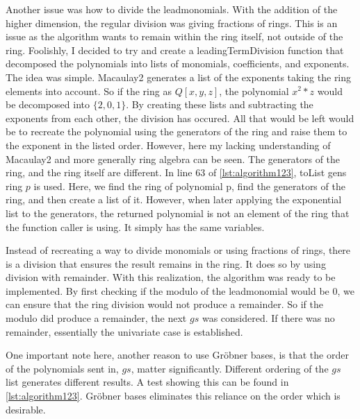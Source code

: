 Another issue was how to divide the leadmonomials. With the addition of the higher dimension, the regular division was giving fractions of rings. This is an issue as the algorithm wants to remain within the ring itself, not outside of the ring. Foolishly, I decided to try and create a leadingTermDivision function that decomposed the polynomials into lists of monomials, coefficients, and exponents. The idea was simple. Macaulay2 generates a list of the exponents taking the ring elements into account. So if the ring as $Q[x,y,z]$, the polynomial $x^2*z$ would be decomposed into $\{2,0,1\}$. By creating these lists and subtracting the exponents from each other, the division has occured. All that would be left would be to recreate the polynomial using the generators of the ring and raise them to the exponent in the listed order. However, here my lacking understanding of Macaulay2 and more generally ring algebra can be seen. The generators of the ring, and the ring itself are different. In line 63 of \ref{lst:algorithm123}, toList gens ring $p$ is used. Here, we find the ring of polynomial p, find the generators of the ring, and then create a list of it. However, when later applying the exponential list to the generators, the returned polynomial is not an element of the ring that the function caller is using. It simply has the same variables. 

Instead of recreating a way to divide monomials or using fractions of rings, there is a division that ensures the result remains in the ring. It does so by using division with remainder. With this realization, the algorithm was ready to be implemented. By first checking if the modulo of the leadmonomial would be $0$, we can ensure that the ring division would not produce a remainder. So if the modulo did produce a remainder, the next $gs$ was considered. If there was no remainder, essentially the univariate case is established. 

One important note here, another reason to use Gröbner bases, is that the order of the polynomials sent in,  $gs$, matter significantly. Different ordering of the $gs$ list generates different results. A test showing this can be found in \ref{lst:algorithm123}. Gröbner bases eliminates this reliance on the order which is desirable.